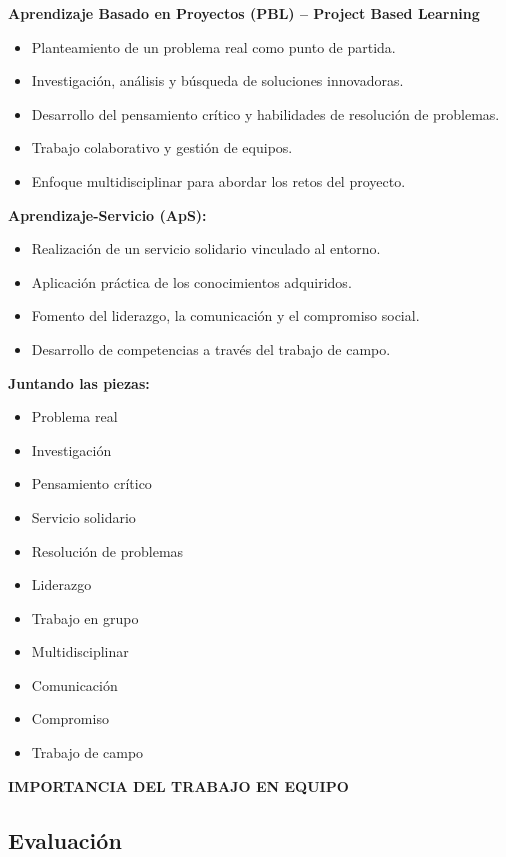 \documentclass[11pt,a4paper]{article}
\begin{document}
	\begin{ObjetivosBox}
		\textbf{Aprendizaje Basado en Proyectos (PBL) -- Project Based Learning}
		\begin{itemize}[leftmargin=1.5em]
			\item Planteamiento de un problema real como punto de partida.
			\item Investigación, análisis y búsqueda de soluciones innovadoras.
			\item Desarrollo del pensamiento crítico y habilidades de resolución de problemas.
			\item Trabajo colaborativo y gestión de equipos.
			\item Enfoque multidisciplinar para abordar los retos del proyecto.
		\end{itemize}

		\vspace{0.5em}
		\textbf{Aprendizaje-Servicio (ApS):}
		\begin{itemize}[leftmargin=1.5em]
			\item Realización de un servicio solidario vinculado al entorno.
			\item Aplicación práctica de los conocimientos adquiridos.
			\item Fomento del liderazgo, la comunicación y el compromiso social.
			\item Desarrollo de competencias a través del trabajo de campo.
		\end{itemize}

		\textbf{Juntando las piezas:}
		\begin{itemize}[leftmargin=1.5em]
			\item Problema real
			\item Investigación
			\item Pensamiento crítico
			\item Servicio solidario
			\item Resolución de problemas
			\item Liderazgo
			\item Trabajo en grupo
			\item Multidisciplinar
			\item Comunicación
			\item Compromiso
			\item Trabajo de campo
		\end{itemize}
		\textbf{IMPORTANCIA DEL TRABAJO EN EQUIPO}
	\end{ObjetivosBox}

	\subsection*{Evaluación}
\end{document}
